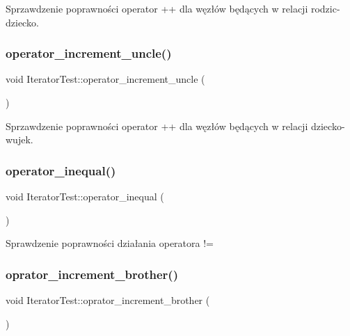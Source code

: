 Sprzawdzenie poprawności operator ++ dla węzłów będących w relacji rodzic-\/dziecko. \mbox{\label{class_iterator_test_a72553c8a4a8fd93ae2c534e4a053325a}} 
\subsubsection{\texorpdfstring{operator\+\_\+increment\+\_\+uncle()}{operator\_increment\_uncle()}}
{\footnotesize\ttfamily void Iterator\+Test\+::operator\+\_\+increment\+\_\+uncle (\begin{DoxyParamCaption}{ }\end{DoxyParamCaption})\hspace{0.3cm}{\ttfamily [inline]}}

Sprzawdzenie poprawności operator ++ dla węzłów będących w relacji dziecko-\/wujek. \mbox{\label{class_iterator_test_acd1cdaec5c6d5a2b183bbb8dbd979c2a}} 
\subsubsection{\texorpdfstring{operator\+\_\+inequal()}{operator\_inequal()}}
{\footnotesize\ttfamily void Iterator\+Test\+::operator\+\_\+inequal (\begin{DoxyParamCaption}{ }\end{DoxyParamCaption})\hspace{0.3cm}{\ttfamily [inline]}}

Sprawdzenie poprawności działania operatora != \mbox{\label{class_iterator_test_a3345cdda3230924d692933e2fa9ed348}} 
\subsubsection{\texorpdfstring{oprator\+\_\+increment\+\_\+brother()}{oprator\_increment\_brother()}}
{\footnotesize\ttfamily void Iterator\+Test\+::oprator\+\_\+increment\+\_\+brother (\begin{DoxyParamCaption}{ }\end{DoxyParamCaption})\hspace{0.3cm}{\ttfamily [inline]}}

